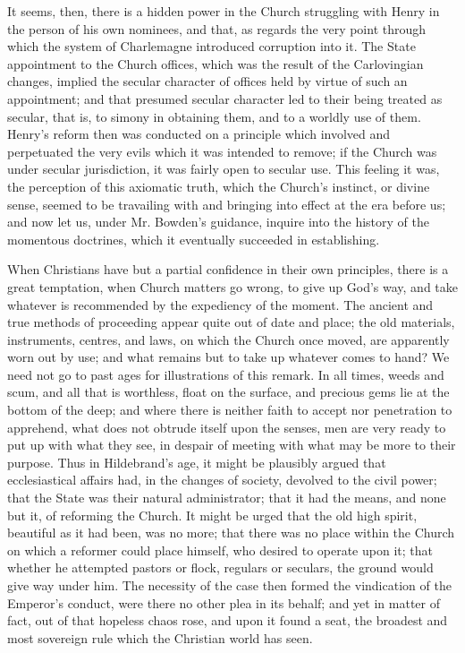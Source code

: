It seems, then, there is a hidden power in the
Church struggling with Henry in the person of his own nominees, and
that, as regards the very point through which the system of
Charlemagne introduced corruption into it. The State appointment to
the Church offices, which was the result of the Carlovingian changes,
implied the secular character of offices held by virtue of such an
appointment; and that presumed secular character led to their being
treated as secular, that is, to simony in obtaining them, and to a
worldly use of them. Henry's reform then was conducted on a principle
which involved and perpetuated the very evils which it was intended to
remove; if the Church was under secular jurisdiction, it was fairly
open to secular use. This feeling it was, the perception of this
axiomatic truth, which the Church's instinct, or divine sense, seemed
to be travailing with and bringing into effect at the era before us;
and now let us, under Mr. Bowden's guidance, inquire into the history
of the momentous doctrines, which it eventually succeeded in
establishing.

When Christians have but a partial confidence in
their own principles, there is a great temptation, when Church matters
go wrong, to give up God's way, and take whatever is recommended
by the expediency of the moment. The ancient and true methods of
proceeding appear quite out of date and place; the old materials,
instruments, centres, and laws, on which the Church once moved, are
apparently worn out by use; and what remains but to take up whatever
comes to hand? We need not go to past ages for illustrations of this
remark. In all times, weeds and scum, and all that is worthless, float
on the surface, and precious gems lie at the bottom of the deep; and
where there is neither faith to accept nor penetration to apprehend,
what does not obtrude itself upon the senses, men are very ready to
put up with what they see, in despair of meeting with what may be more
to their purpose. Thus in Hildebrand's age, it might be plausibly
argued that ecclesiastical affairs had, in the changes of society,
devolved to the civil power; that the State was their natural
administrator; that it had the means, and none but it, of reforming
the Church. It might be urged that the old high spirit, beautiful as
it had been, was no more; that there was no place within the Church on
which a reformer could place himself, who desired to operate upon it;
that whether he attempted pastors or flock, regulars or seculars, the
ground would give way under him. The necessity of the case then formed
the vindication of the Emperor's conduct, were there no other plea in
its behalf; and yet in matter of fact, out of that hopeless chaos
rose, and upon it found a seat, the broadest and most sovereign rule
which the Christian world has seen.

